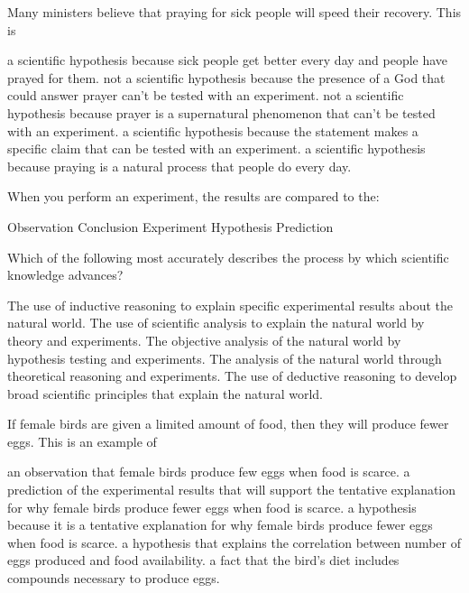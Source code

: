 
\question
Many ministers believe that praying for sick people will speed their recovery.  This is

\begin{choices}
\choice a scientific hypothesis because sick people get better every day and people have prayed for them.
\choice not a scientific hypothesis because the presence of a God that could answer prayer can't be tested with an experiment.
\choice not a scientific hypothesis because prayer is a supernatural phenomenon that can't be tested with an experiment.
\correctchoice a scientific hypothesis because the statement makes a specific claim that can be tested with an experiment.
\choice a scientific hypothesis because praying is a natural process that people do every day.
\end{choices}

\question
When you perform an experiment, the results are compared to the:

\begin{choices}
\choice Observation 
\choice Conclusion
\choice Experiment
\choice Hypothesis
\correctchoice Prediction
\end{choices}

\question
Which of the following most accurately describes the process by which scientific knowledge advances? 

\begin{choices}
\choice The use of inductive reasoning to explain specific experimental results about the natural world.
\choice The use of scientific analysis to explain the natural world by theory and experiments.
\correctchoice The objective analysis of the natural world by hypothesis testing and experiments.
\choice The analysis of the natural world through theoretical reasoning and experiments.
\choice The use of deductive reasoning to develop broad scientific principles that explain the natural world.
\end{choices}

\question
If female birds are given a limited amount of food, then they will produce fewer eggs.  This is an example of

\begin{choices}
\choice an observation that female birds produce few eggs when food is scarce.
\correctchoice a prediction of the experimental results that will support the tentative explanation for why female birds produce fewer eggs when food is scarce.
\choice a hypothesis because it is a tentative explanation for why female birds produce fewer eggs when food is scarce.
\choice a hypothesis that explains the correlation between number of eggs produced and food availability.
\choice a fact that the bird's diet includes compounds necessary to produce eggs.
\end{choices}

